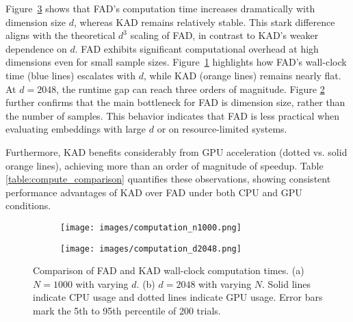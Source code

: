 Figure~\ref{fig:computation} shows that FAD’s computation time increases dramatically with dimension size $d$, whereas KAD remains relatively stable. This stark difference aligns with the theoretical $d^3$ scaling of FAD, in contrast to KAD’s weaker dependence on $d$. FAD exhibits significant computational overhead at high dimensions even for small sample sizes. Figure~\ref{fig:computation_n1000} highlights how FAD’s wall-clock time (blue lines) escalates with $d$, while KAD (orange lines) remains nearly flat. At $d=2048$, the runtime gap can reach three orders of magnitude. Figure \ref{fig:computation_d2048} further confirms that the main bottleneck for FAD is dimension size, rather than the number of samples. This behavior indicates that FAD is less practical when evaluating embeddings with large $d$ or on resource-limited systems.

Furthermore, KAD benefits considerably from GPU acceleration (dotted vs. solid orange lines), achieving more than an order of magnitude of speedup. Table \ref{table:compute_comparison} quantifies these observations, showing consistent performance advantages of KAD over FAD under both CPU and GPU conditions.

\begin{figure}[t]
    \centering
    \begin{subfigure}{0.48\textwidth}
        \centering
        \texttt{[image: images/computation\_n1000.png]}
        \vspace{-0.7cm}
        \subcaption{}
        \label{fig:computation_n1000}
    \end{subfigure}
    \begin{subfigure}{0.48\textwidth}
        \centering
        \texttt{[image: images/computation\_d2048.png]}
        \vspace{-0.7cm}
        \subcaption{}
        \label{fig:computation_d2048}
    \end{subfigure}
    \vspace{-0.2cm}
    \caption{Comparison of FAD and KAD wall-clock computation times. 
    (a) $N=1000$ with varying $d$. (b) $d=2048$ with varying $N$. Solid lines indicate CPU usage and dotted lines indicate GPU usage. Error bars mark the 5th to 95th percentile of 200 trials.}
    \label{fig:computation}
\end{figure}

